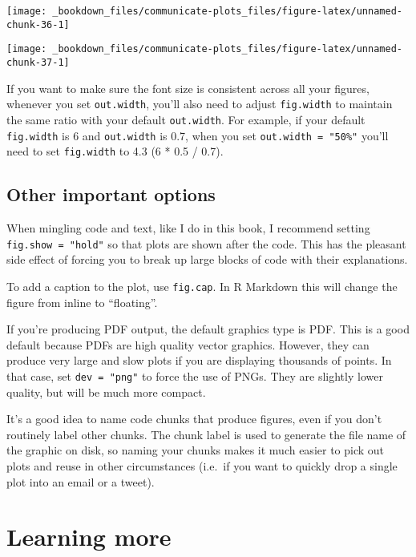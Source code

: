 \documentclass[]{book}
\begin{document}
\begin{center}\texttt{[image: \_bookdown\_files/communicate-plots\_files/figure-latex/unnamed-chunk-36-1]} \end{center}

\begin{center}\texttt{[image: \_bookdown\_files/communicate-plots\_files/figure-latex/unnamed-chunk-37-1]} \end{center}

If you want to make sure the font size is consistent across all your
figures, whenever you set \texttt{out.width}, you'll also need to adjust
\texttt{fig.width} to maintain the same ratio with your default
\texttt{out.width}. For example, if your default \texttt{fig.width} is 6
and \texttt{out.width} is 0.7, when you set
\texttt{out.width\ =\ "50\%"} you'll need to set \texttt{fig.width} to
4.3 (6 * 0.5 / 0.7).

\hypertarget{other-important-options}{\subsection{Other important
options}\label{other-important-options}}

When mingling code and text, like I do in this book, I recommend setting
\texttt{fig.show\ =\ "hold"} so that plots are shown after the code.
This has the pleasant side effect of forcing you to break up large
blocks of code with their explanations.

To add a caption to the plot, use \texttt{fig.cap}. In R Markdown this
will change the figure from inline to ``floating''.

If you're producing PDF output, the default graphics type is PDF. This
is a good default because PDFs are high quality vector graphics.
However, they can produce very large and slow plots if you are
displaying thousands of points. In that case, set \texttt{dev\ =\ "png"}
to force the use of PNGs. They are slightly lower quality, but will be
much more compact.

It's a good idea to name code chunks that produce figures, even if you
don't routinely label other chunks. The chunk label is used to generate
the file name of the graphic on disk, so naming your chunks makes it
much easier to pick out plots and reuse in other circumstances (i.e.~if
you want to quickly drop a single plot into an email or a tweet).

\section{Learning more}\label{learning-more-3}
\end{document}
